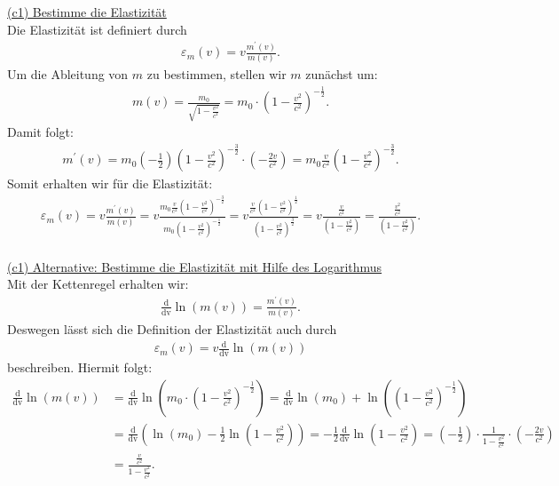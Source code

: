 \underline{(c1) Bestimme die Elastizität}\\
Die Elastizität ist definiert durch
\begin{align*}
	\varepsilon_m(v) = v \frac{m^\prime(v)}{m(v)}.
\end{align*}
Um die Ableitung von $ m $ zu bestimmen, stellen wir $ m $ zunächst um:
\begin{align*}
	m(v)
	=
	\frac{m_0}{\sqrt{1 - \frac{v^2}{c^2}}}
	= 
	m_0 \cdot \left(1 - \frac{v^2}{c^2}\right)^{-\frac{1}{2}}.
\end{align*}
Damit folgt:
\begin{align*}
	m^\prime(v)
	=
	m_0 \left(-\frac{1}{2}\right) \left(1 - \frac{v^2}{c^2}\right)^{-\frac{3}{2}} \cdot  \left(-\frac{2v}{c^2}\right)
	=
	m_0 \frac{v}{c^2} \left(1 - \frac{v^2}{c^2}\right)^{-\frac{3}{2}}.
\end{align*}
Somit erhalten wir für die Elastizität:
\begin{align*}
	\varepsilon_m(v)
	=
	v \frac{m^\prime(v)}{m(v)}
	=
	v
	\frac{m_0 \frac{v}{c^2} \left(1 - \frac{v^2}{c^2}\right)^{-\frac{3}{2}}}{m_0  \left(1 - \frac{v^2}{c^2}\right)^{-\frac{1}{2}}}
	=
	v
	\frac{\frac{v}{c^2} \left(1 - \frac{v^2}{c^2}\right)^{\frac{1}{2}}}{ \left(1 - \frac{v^2}{c^2}\right)^{\frac{3}{2}}}
	=
	v
	\frac{\frac{v}{c^2} }{ \left(1 - \frac{v^2}{c^2}\right)}
	=
	\frac{\frac{v^2}{c^2} }{ \left(1 - \frac{v^2}{c^2}\right)}.
\end{align*}
\ \\
\underline{(c1) Alternative: Bestimme die Elastizität mit Hilfe des Logarithmus}\\
Mit der Kettenregel erhalten wir:
\begin{align*}
	\frac{\mathrm{d}}{\mathrm{dv}} \ln(m(v))
	=
	\frac{m^\prime(v)}{m(v)}.
\end{align*}
Deswegen lässt sich die Definition der Elastizität auch durch 
\begin{align*}
		\varepsilon_m(v) = v \frac{\mathrm{d}}{\mathrm{dv}}\ln(m(v))
\end{align*}
beschreiben. Hiermit folgt:
\begin{align*}
	\frac{\mathrm{d}}{\mathrm{dv}}\ln(m(v))
	&=
	\frac{\mathrm{d}}{\mathrm{dv}}
	\ln\left(	m_0 \cdot \left(1 - \frac{v^2}{c^2}\right)^{-\frac{1}{2}}\right)
	=
	\frac{\mathrm{d}}{\mathrm{dv}}
	\ln\left(	m_0 \right)+ \ln\left( \left(1 - \frac{v^2}{c^2}\right)^{-\frac{1}{2}}\right)\\
	&=
	\frac{\mathrm{d}}{\mathrm{dv}}\left(
	\ln\left(	m_0 \right)- \frac{1}{2} \ln\left( 1 - \frac{v^2}{c^2}\right)
	\right)
	=
	- \frac{1}{2}\frac{\mathrm{d}}{\mathrm{dv}}\ln\left( 1 - \frac{v^2}{c^2}\right)
	=
	\left(- \frac{1}{2}\right) \cdot  \frac{1}{1 - \frac{v^2}{c^2}} \cdot \left(-\frac{2v}{c^2}\right)\\
	&=
	\frac{\frac{v}{c^2}}{1 - \frac{v^2}{c^2}}.
\end{align*}
